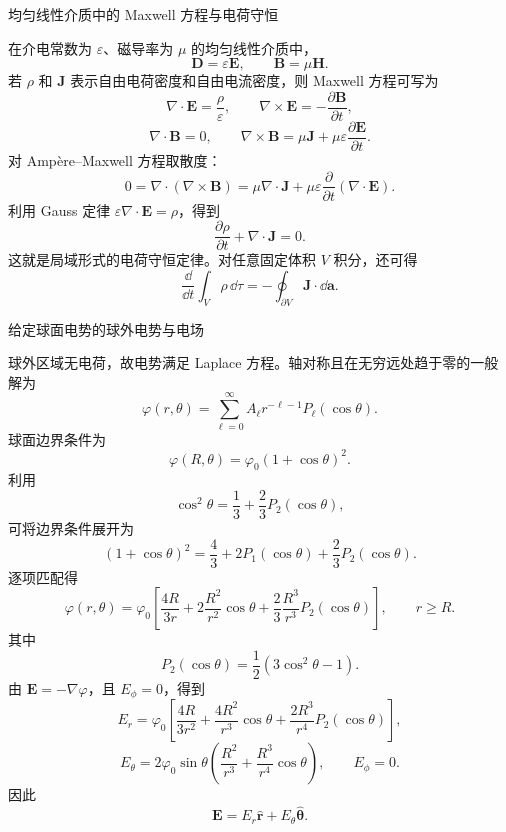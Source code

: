 
\begin{question}
均匀线性介质中的 Maxwell 方程与电荷守恒
\begin{solution}
在介电常数为 $\varepsilon$、磁导率为 $\mu$ 的均匀线性介质中，
\[
  \mathbf D=\varepsilon\mathbf E,
  \qquad
  \mathbf B=\mu\mathbf H .
\]
若 $\rho$ 和 $\mathbf J$ 表示自由电荷密度和自由电流密度，则 Maxwell 方程可写为
\[
  \boxed{\nabla\cdot\mathbf E=\frac{\rho}{\varepsilon}},
  \qquad
  \boxed{\nabla\times\mathbf E=-\frac{\partial\mathbf B}{\partial t}},
\]
\[
  \boxed{\nabla\cdot\mathbf B=0},
  \qquad
  \boxed{\nabla\times\mathbf B=\mu\mathbf J+\mu\varepsilon\frac{\partial\mathbf E}{\partial t}} .
\]
对 Amp\`ere--Maxwell 方程取散度：
\[
  0=\nabla\cdot(\nabla\times\mathbf B)
  =\mu\nabla\cdot\mathbf J
  +\mu\varepsilon\frac{\partial}{\partial t}(\nabla\cdot\mathbf E).
\]
利用 Gauss 定律 $\varepsilon\nabla\cdot\mathbf E=\rho$，得到
\[
  \boxed{\frac{\partial\rho}{\partial t}+\nabla\cdot\mathbf J=0}.
\]
这就是局域形式的电荷守恒定律。对任意固定体积 $V$ 积分，还可得
\[
  \frac{\dd}{\dd t}\int_V\rho\,\dd\tau
  =-\oint_{\partial V}\mathbf J\cdot\dd\mathbf a .
\]
\end{solution}
\end{question}

\begin{question}
给定球面电势的球外电势与电场
\begin{solution}
球外区域无电荷，故电势满足 Laplace 方程。轴对称且在无穷远处趋于零的一般解为
\[
  \varphi(r,\theta)=\sum_{\ell=0}^{\infty}A_\ell r^{-\ell-1}P_\ell(\cos\theta).
\]
球面边界条件为
\[
  \varphi(R,\theta)=\varphi_0(1+\cos\theta)^2.
\]
利用
\[
  \cos^2\theta=\frac13+\frac23P_2(\cos\theta),
\]
可将边界条件展开为
\[
  (1+\cos\theta)^2
  =\frac43+2P_1(\cos\theta)+\frac23P_2(\cos\theta).
\]
逐项匹配得
\[
  \boxed{
  \varphi(r,\theta)=\varphi_0\left[
  \frac{4R}{3r}
  +2\frac{R^2}{r^2}\cos\theta
  +\frac23\frac{R^3}{r^3}P_2(\cos\theta)
  \right]},
  \qquad r\ge R .
\]
其中
\[
  P_2(\cos\theta)=\frac12(3\cos^2\theta-1).
\]
由 $\mathbf E=-\nabla\varphi$，且 $E_\phi=0$，得到
\[
  \boxed{
  E_r=\varphi_0\left[
  \frac{4R}{3r^2}
  +\frac{4R^2}{r^3}\cos\theta
  +\frac{2R^3}{r^4}P_2(\cos\theta)
  \right]},
\]
\[
  \boxed{
  E_\theta=2\varphi_0\sin\theta\left(
  \frac{R^2}{r^3}+\frac{R^3}{r^4}\cos\theta
  \right)},
  \qquad E_\phi=0 .
\]
因此
\[
  \boxed{\mathbf E=E_r\hat{\mathbf r}+E_\theta\hat{\boldsymbol\theta}} .
\]
\end{solution}
\end{question}

